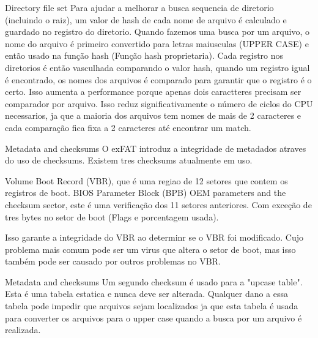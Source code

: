 \documentclass[11pt]{beamer}
\begin{document}
\begin{frame}{Directory file set}
Para ajudar a melhorar a busca sequencia de diretorio (incluindo o raiz), um valor de hash de cada nome de arquivo é calculado e guardado no registro do diretorio. Quando fazemos uma busca por um arquivo, o nome do arquivo é primeiro convertido para letras maiusculas (UPPER CASE) e então usado na função hash (Função hash proprietaria). Cada registro nos diretorios é então vasculhada comparando o valor hash, quando um registro igual é encontrado, os nomes dos arquivos é comparado para garantir que o registro é o certo. Isso aumenta a performance porque apenas dois caractteres precisam ser comparador por arquivo. Isso reduz significativamente o número de ciclos do CPU necessarios, ja que a maioria dos arquivos tem nomes de mais de 2 caracteres e cada comparação fica fixa a 2 caracteres até encontrar um match.
\end{frame}

\begin{frame}{Metadata and checksums}
O exFAT introduz a integridade de metadados atraves do uso de checksums. Existem tres checksums atualmente em uso. 

Volume Boot Record (VBR), que é uma regiao de 12 setores que contem os registros de boot.
BIOS Parameter Block (BPB)
OEM parameters and the checksum sector, este é uma verificação dos 11 setores anteriores. Com exceção de tres bytes no setor de boot (Flags e porcentagem usada).

Isso garante a integridade do VBR ao determinr se o VBR foi modificado. Cujo problema mais comum pode ser um virus que altera o setor de boot, mas isso também pode ser causado por outros problemas no VBR.
\end{frame}

\begin{frame}{Metadata and checksums}
Um segundo checksum é usado para a "upcase table". Esta é uma tabela estatica e nunca deve ser alterada. Qualquer dano a essa tabela pode impedir  que arquivos sejam localizados ja que esta tabela é usada para converter os arquivos para o upper case quando a busca por um arquivo é realizada.
\end{frame}
\end{document}
